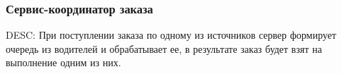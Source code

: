 \subsubsection{Сервис-координатор заказа} \label{selection_drivers_for_the_order}

    DESC:  При поступлении заказа по одному из источников сервер формирует очередь из водителей и обрабатывает ее, в результате заказ будет взят на выполнение одним из них. 

     
    
    

    

    